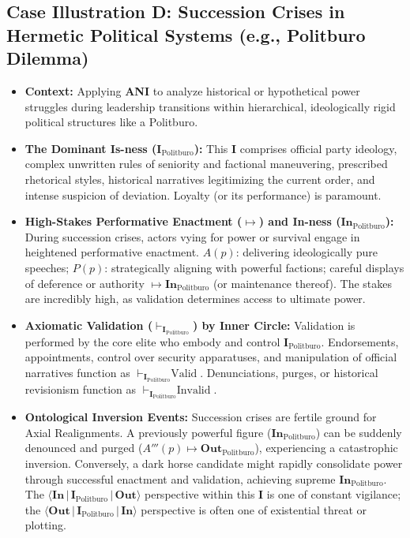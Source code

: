 \documentclass{article}
\newcommand{\ANI}{\textbf{ANI}}             %
\newcommand{\Isness}{\mathbf{I}}            %
\newcommand{\Inness}{\mathbf{In}}           %
\newcommand{\Outness}{\mathbf{Out}}         %
\newcommand{\enactment}{\ensuremath{\mapsto}} %
\newcommand{\validates}[1]{\ensuremath{\vdash_{#1}}} %
\newcommand{\orientation}[3]{\ensuremath{\langle #1 \,|\, #2 \,|\, #3 \rangle}} %
\begin{document}
\subsection{Case Illustration D: Succession Crises in Hermetic Political Systems (e.g., Politburo Dilemma)}

\begin{itemize}
    \item \textbf{Context:} Applying \ANI{} to analyze historical or hypothetical power struggles during leadership transitions within hierarchical, ideologically rigid political structures like a Politburo.
    \item \textbf{The Dominant Is-ness ($\Isness_{\text{Politburo}}$):} This $\Isness$ comprises official party ideology, complex unwritten rules of seniority and factional maneuvering, prescribed rhetorical styles, historical narratives legitimizing the current order, and intense suspicion of deviation. Loyalty (or its performance) is paramount.
    \item \textbf{High-Stakes Performative Enactment ($\enactment$) and In-ness ($\Inness_{\text{Politburo}}$):} During succession crises, actors vying for power or survival engage in heightened performative enactment. $A(p)$: delivering ideologically pure speeches; $P(p)$: strategically aligning with powerful factions; careful displays of deference or authority $\enactment \Inness_{\text{Politburo}}$ (or maintenance thereof). The stakes are incredibly high, as validation determines access to ultimate power.
    \item \textbf{Axiomatic Validation ($\validates{\Isness_{\text{Politburo}}}$) by Inner Circle:} Validation is performed by the core elite who embody and control $\Isness_{\text{Politburo}}$. Endorsements, appointments, control over security apparatuses, and manipulation of official narratives function as $\validates{\Isness_{\text{Politburo}}} \text{Valid}$. Denunciations, purges, or historical revisionism function as $\validates{\Isness_{\text{Politburo}}} \text{Invalid}$.
    \item \textbf{Ontological Inversion Events:} Succession crises are fertile ground for Axial Realignments. A previously powerful figure ($\Inness_{\text{Politburo}}$) can be suddenly denounced and purged ($A'''(p) \enactment \Outness_{\text{Politburo}}$), experiencing a catastrophic inversion. Conversely, a dark horse candidate might rapidly consolidate power through successful enactment and validation, achieving supreme $\Inness_{\text{Politburo}}$. The $\orientation{\Inness}{\Isness_{\text{Politburo}}}{\Outness}$ perspective within this $\Isness$ is one of constant vigilance; the $\orientation{\Outness}{\Isness_{\text{Politburo}}}{\Inness}$ perspective is often one of existential threat or plotting.

\end{itemize}
\end{document}
